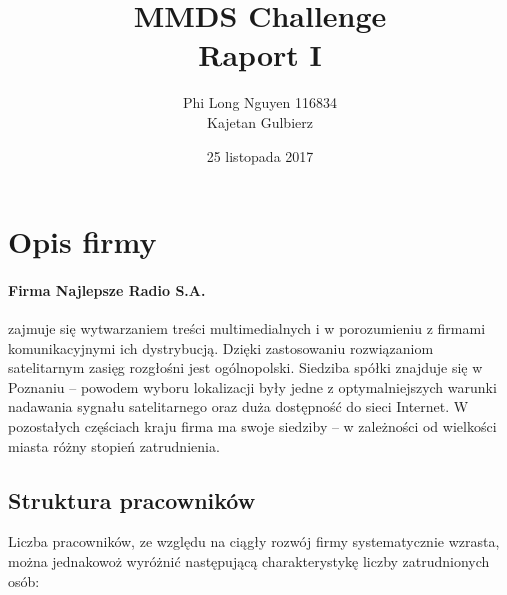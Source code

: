\documentclass[a4paper,11pt]{article}
\author{Phi Long Nguyen 116834 \\ Kajetan Gulbierz}
\title{MMDS Challenge\\
\large{{\bf Raport I}  }}
\date{25 listopada  2017}
\begin{document}
\maketitle 

\section{Opis firmy}
\paragraph{Firma Najlepsze Radio S.A.} zajmuje się wytwarzaniem treści multimedialnych i w porozumieniu z firmami komunikacyjnymi ich dystrybucją. Dzięki zastosowaniu rozwiązaniom satelitarnym zasięg rozgłośni jest ogólnopolski. Siedziba spółki znajduje się w Poznaniu – powodem wyboru lokalizacji były jedne z optymalniejszych warunki nadawania sygnału satelitarnego oraz duża dostępność do sieci Internet. W pozostałych częściach kraju firma ma swoje siedziby – w zależności od wielkości miasta różny stopień zatrudnienia. 


\subsection{Struktura pracowników } 
Liczba pracowników, ze względu na ciągły rozwój firmy systematycznie wzrasta, można jednakowoż wyróżnić następującą charakterystykę liczby zatrudnionych osób: 
\end{document}
